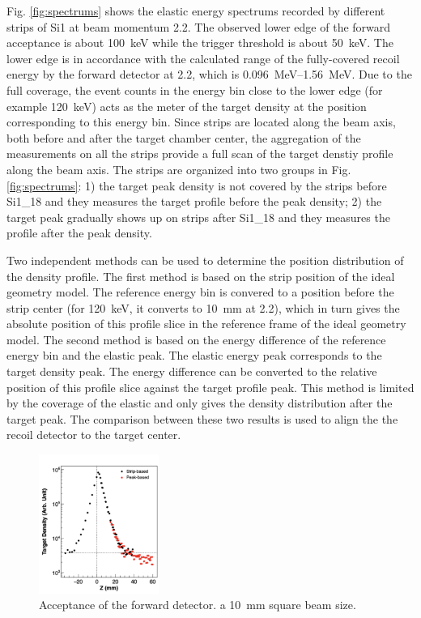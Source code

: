 \documentclass[fleqn,twocolumn,a4paper]{ikpar}
\begin{document}
Fig. \ref{fig:spectrums} shows the elastic energy spectrums recorded by different strips of Si1 at beam momentum \SI{2.2}{\momentum}.
The observed lower edge of the forward acceptance is about \SI{100}{\keV} while the
trigger threshold is about \SI{50}{\keV}.
The lower edge is in accordance with the calculated range of the
fully-covered recoil energy by the forward detector at \SI{2.2}{\momentum},
which is \SIrange{0.096}{1.56}{\MeV}.
Due to the full coverage, the event counts in the energy bin close to the lower edge (for example
\SI{120}{\keV}) acts as the meter of the target density at the position
corresponding to this energy bin.
Since strips are located along the beam axis, both before and after the target
chamber center, the aggregation of the measurements on all the strips provide a full scan of the target denstiy profile along the beam axis.
The strips are organized into two groups in Fig. \ref{fig:spectrums}: 1) the
target peak density is not covered by the strips
before Si1\_18 and they measures the target profile before the peak density; 2) the target
peak gradually shows up on strips after Si1\_18 and they measures the profile
after the peak density.

\par
\medskip

Two independent methods can be used to determine the position distribution of the density profile.
The first method is based on the strip position of the ideal geometry model.
The reference energy bin is convered to a position before the strip center (for
\SI{120}{\keV}, it converts to \SI{10}{\mm} at \SI{2.2}{\momentum}), which in turn
gives the absolute position of this profile slice in the reference frame of the
ideal geometry model.
The second method is based on the energy difference of the reference energy bin
and the elastic peak.
The elastic energy peak corresponds to the target density peak.
The energy difference can be converted to the relative position of this profile
slice against the target profile peak.
This method is limited by the coverage of the elastic and only gives the density distribution after the target peak.
The comparison between these two results is used to align the the recoil
detector to the target center.
\begin{figure}[htbp]
  \centering
	\includegraphics[width=0.35\textwidth]{./target_density_result.png}
  \caption{Acceptance of the forward detector. a \SI{10}{\mm} square beam size.}
  \label{fig:target_density_result}
\end{figure}
\end{document}
